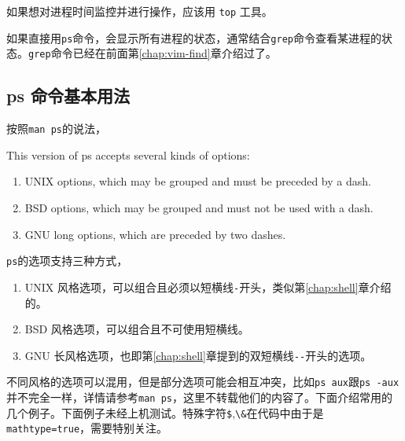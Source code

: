 \documentclass[doctor,openright,twoside]{sjtuthesis}
\renewenvironment{quote}
  {\list{}{\rightmargin\leftmargin}%
    \item\relax}
  {\endlist}
\providecommand{\tightlist}{%
    \setlength{\itemsep}{0pt}\setlength{\parskip}{0pt}}
\newcommand{\passthrough}[1]{#1}
\theoremstyle{plain}
\theoremstyle{definition}
\theoremstyle{remark}
\theoremstyle{ocrenumbox}
\theoremstyle{plain}
\begin{document}
如果想对进程时间监控并进行操作，应该用 \passthrough{\lstinline!top!}
工具。

如果直接用\passthrough{\lstinline!ps!}命令，会显示所有进程的状态，通常结合\passthrough{\lstinline!grep!}命令查看某进程的状态。\passthrough{\lstinline!grep!}命令已经在前面第\ref{chap:vim-find}章介绍过了。

\hypertarget{ps-}{%
\subsection{ps 命令基本用法}\label{ps-}}

按照\passthrough{\lstinline!man ps!}的说法，

\begin{quote}
This version of ps accepts several kinds of options:

\begin{enumerate}
\def\labelenumi{\arabic{enumi}.}
\tightlist
\item
  UNIX options, which may be grouped and must be preceded by a dash.
\item
  BSD options, which may be grouped and must not be used with a dash.
\item
  GNU long options, which are preceded by two dashes.
\end{enumerate}
\end{quote}

\passthrough{\lstinline!ps!}的选项支持三种方式，

\begin{enumerate}
\def\labelenumi{\arabic{enumi}.}
\tightlist
\item
  UNIX
  风格选项，可以组合且必须以短横线\passthrough{\lstinline!-!}开头，类似第\ref{chap:shell}章介绍的。
\item
  BSD 风格选项，可以组合且不可使用短横线。
\item
  GNU
  长风格选项，也即第\ref{chap:shell}章提到的双短横线\passthrough{\lstinline!--!}开头的选项。
\end{enumerate}

不同风格的选项可以混用，但是部分选项可能会相互冲突，比如\passthrough{\lstinline!ps aux!}跟\passthrough{\lstinline!ps -aux!}并不完全一样，详情请参考\passthrough{\lstinline!man ps!}，这里不转载他们的内容了。下面介绍常用的几个例子。下面例子未经上机测试。特殊字符\passthrough{\lstinline!$!},\passthrough{\lstinline!\&!}在代码中由于是\passthrough{\lstinline!mathtype=true!}，需要特别关注。
\end{document}
